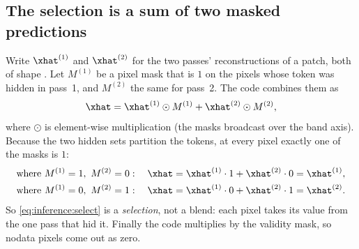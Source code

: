 \subsection{The selection is a sum of two masked predictions}

Write $\xhat^{(1)}$ and $\xhat^{(2)}$ for the two passes' reconstructions of a patch, both of shape
. Let $M^{(1)}$ be a pixel mask that is $1$ on the pixels whose token was hidden in
pass~1, and $M^{(2)}$ the same for pass~2. The code combines them as
\begin{equation}
\xhat = \xhat^{(1)}\odot M^{(1)} + \xhat^{(2)}\odot M^{(2)},
\label{eq:inference:select}
\end{equation}
where $\odot$ is element-wise multiplication (the masks broadcast over the band axis). Because the two hidden
sets partition the tokens, at every pixel exactly one of the masks is $1$:
\begin{align*}
\text{where } M^{(1)}=1,\ M^{(2)}=0:\quad \xhat &= \xhat^{(1)}\cdot1+\xhat^{(2)}\cdot0 = \xhat^{(1)},\\
\text{where } M^{(1)}=0,\ M^{(2)}=1:\quad \xhat &= \xhat^{(1)}\cdot0+\xhat^{(2)}\cdot1 = \xhat^{(2)}.
\end{align*}
So \cref{eq:inference:select} is a \emph{selection}, not a blend: each pixel takes its value from the one pass
that hid it. Finally the code multiplies by the validity mask, so nodata pixels come out as zero.

